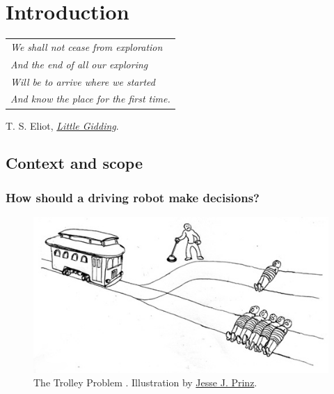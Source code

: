 
\graphicspath{{2-Chapters/1-Chapter/}}

\chapter{Introduction}
\label{chapter:1}

\begin{flushright}
	\begin{tabular}{@{}l@{}}
		\emph{We shall not cease from exploration}\\
		\emph{And the end of all our exploring}\\
		\emph{Will be to arrive where we started}\\
		\emph{And know the place for the first time.}\\
	\end{tabular}
	
	T. S. Eliot, \href{https://eleurent.github.io/sisyphe/texts/little-gidding.html}{\emph{Little Gidding}}.
\end{flushright}


\section{Context and scope}


\subsection{How should a driving robot make decisions?}
\label{sec:trolley}


\begin{figure}[tp]
	\centering
	\includegraphics[width=0.7\linewidth]{img/trolley}
	\caption{The Trolley Problem \citep{Foot1967}. Illustration by \href{http://subcortex.com/}{Jesse J. Prinz}.}
	\label{fig:trolley}
\end{figure}

